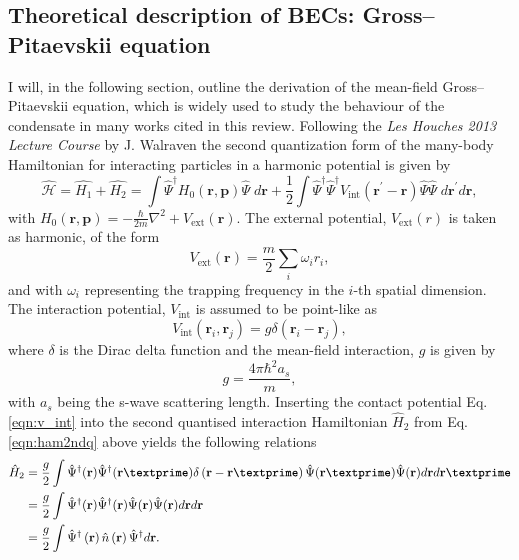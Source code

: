 \subsection{Theoretical description of BECs: Gross--Pitaevskii equation}\label{sub:gpederiv}
I will, in the following section, outline the derivation of the mean-field Gross--Pitaevskii equation, which is widely used to study the behaviour of the condensate in many works cited in this review. Following the \textit{Les Houches 2013 Lecture Course} by J. Walraven \cite{LEC:Walraven_lh_2013} the second quantization form of the many-body Hamiltonian for interacting particles in a harmonic potential is given by
\begin{equation}\label{eqn:ham2ndq}
\hat{\mathcal{H}} = \hat{H_1} + \hat{H_2} = \int \hat{\Psi}^{\dagger} H_0\left(\textbf{r},\textbf{p} \right)  \hat{\Psi} \; d\textbf{r}  + \frac{1}{2} \int\hat{\Psi}^{\dagger}\hat{\Psi}^{\dagger}V_{\textrm{int}}(\textbf{r}^\prime-\textbf{r})\hat{\Psi}\hat{\Psi} \; d\textbf{r}^\prime d\textbf{r},
\end{equation}
with $H_0\left(\textbf{r}, \textbf{p} \right) = -\frac{\hbar}{2m}\nabla^2 + V_{\textrm{ext}}\left(\textbf{r}\right)$. The external potential, $V_{\text{ext}}(r)$ is taken as harmonic, of the form
\begin{equation}
V_{\text{ext}}(\textbf{r}) = \frac{m}{2}\displaystyle\sum_{i}{\omega_i r_i},
\end{equation}
and with $\omega_i$ representing the trapping frequency in the $i$-th spatial dimension. The interaction potential, $V_{\text{int}}$ is assumed to be point-like as
\begin{equation}\label{eqn:v_int}
	V_{\text{int}}\left(\textbf{r}_i,\textbf{r}_j \right) = g\delta\left(\textbf{r}_i - \textbf{r}_j\right),
\end{equation} where $\delta$ is the Dirac delta function and the mean-field interaction, $g$ is given by
\begin{equation}
	g = \frac{4\pi\hbar^2 a_s}{m},
\end{equation}
with $a_s$ being the s-wave scattering length. Inserting the contact potential Eq. \eqref{eqn:v_int} into the second quantised interaction Hamiltonian $\hat{H}_2$ from Eq. \eqref{eqn:ham2ndq} above yields the following relations
\begin{align}
\hat{H}_2 &= \frac{g}{2} \int \hat{\Psi}^{\dagger}(\textbf{r})\hat{\Psi}^{\dagger}(\textbf{r\textprime}) \delta\left(\textbf{r} - \textbf{r\textprime}\right)\hat{\Psi}(\textbf{r\textprime})\hat{\Psi}(\textbf{r})d\textbf{r}d\textbf{r\textprime} \\
 & = \frac{g}{2}\int \hat{\Psi}^{\dagger}(\textbf{r})\hat{\Psi}^{\dagger}(\textbf{r}) \hat{\Psi}(\textbf{r})\hat{\Psi}(\textbf{r})d\textbf{r}d\textbf{r} \\
 & = \frac{g}{2}\int \hat{\Psi}^{\dagger}\left(\textbf{r}\right)\hat{n}\left(\textbf{\textbf{r}}\right)\hat{\Psi}^{\dagger}d\textbf{r}.
\end{align}
